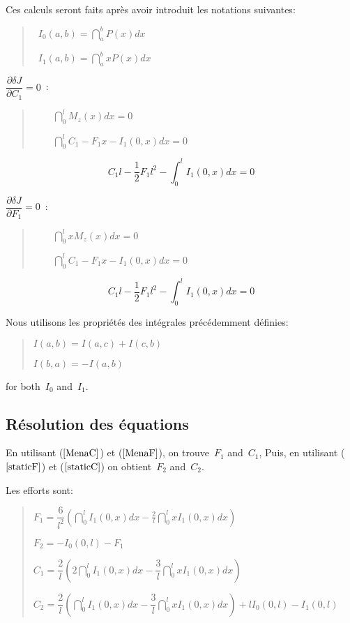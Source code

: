 Ces calculs seront faits après avoir introduit les notations suivantes:
\begin{quotation}
 ~$I_0(a,b)=\dint_a^b P(x)dx$

 ~$I_1(a,b)=\dint_a^b x P(x)dx$
\end{quotation}


$\dfrac{\partial \delta J}{\partial C_1}=0$~:

\begin{quotation}
$\qquad \dint_0^lM_z(x)dx=0$

$\qquad \dint_0^lC_1-F_1x-I_1(0,x)dx=0$
\end{quotation}

\begin{equation}
  \label{MenaC}
  C_1l-\frac 12F_1l^2-\int_0^lI_1(0,x)dx=0
\end{equation}

$\dfrac{\partial \delta J}{\partial F_1}=0$~:

\begin{quotation}
$\qquad \dint_0^lxM_z(x)dx=0$

$\qquad \dint_0^lC_1-F_1x-I_1(0,x)dx=0$
\end{quotation}

\begin{equation}
  \label{MenaF}
  C_1l-\frac 12F_1l^2-\int_0^lI_1(0,x)dx=0
\end{equation}

Nous utilisons les propriétés des intégrales précédemment définies:

\begin{quotation}
$I(a,b)=I(a,c)+I(c,b)$

$I(b,a)=-I(a,b)$
\end{quotation}

for both~$I_0$ and~$I_1$.


\medskip
\subsection{Résolution des équations}

En utilisant ($\ref{MenaC}$) et ($\ref{MenaF}$), on trouve~$F_1$ and~$C_1$,
Puis, en utilisant ($\ref{staticF}$) et ($\ref{staticC}$) on obtient~$F_2$ and~$C_2$.

Les efforts sont:

\begin{quotation}
$F_1=\dfrac 6{l^2}\left( \dint_0^lI_1(0,x)dx-\frac
2l\dint_0^lxI_1(0,x)dx\right)~$

$F_2=-I_0(0,l)-F_1$

$C_1=\dfrac 2l\left( 2\dint_0^lI_1(0,x)dx-\dfrac
3l\dint_0^lxI_1(0,x)dx\right)~$

$C_2=\dfrac 2l\left( \dint_0^lI_1(0,x)dx-\dfrac
3l\dint_0^lxI_1(0,x)dx\right) +lI_0(0,l)-I_1(0,l)$
\end{quotation}

